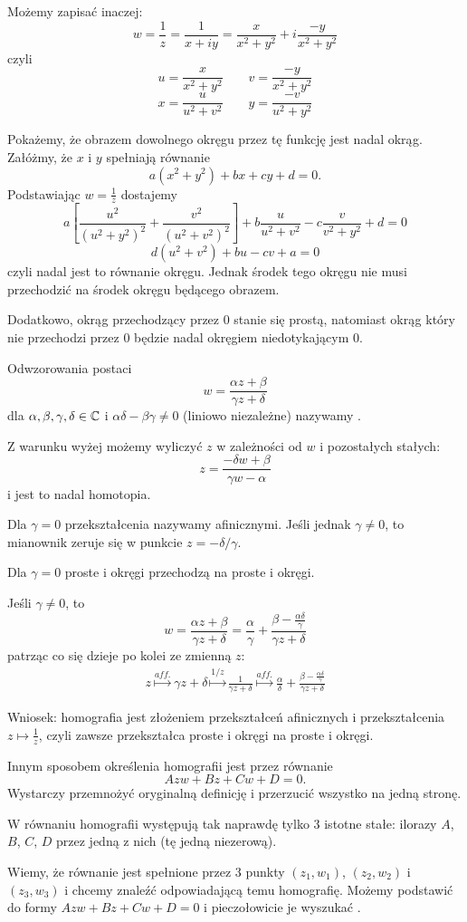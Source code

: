 \begin{example}
  Możemy zapisać inaczej:
  $$w=\frac{1}{z}=\frac{1}{x+iy}=\frac{x}{x^2+y^2}+i\frac{-y}{x^2+y^2}$$
  czyli
  $$u=\frac{x}{x^2+y^2}\quad\quad v=\frac{-y}{x^2+y^2}$$
  $$x=\frac{u}{u^2+v^2}\quad\quad y=\frac{-v}{u^2+y^2}$$

  Pokażemy, że obrazem dowolnego okręgu przez tę funkcję jest nadal okrąg. Załóżmy, że $x$ i $y$ spełniają równanie
  $$a(x^2+y^2)+bx+cy+d=0.$$
  Podstawiając $w=\frac{1}{z}$ dostajemy
  $$a\left[\frac{u^2}{(u^2+y^2)^2}+\frac{v^2}{(u^2+v^2)^2}\right]+b\frac{u}{u^2+v^2}-c\frac{v}{v^2+y^2}+d=0$$
  $$d(u^2+v^2)+bu-cv+a=0$$
  czyli nadal jest to równanie okręgu. Jednak środek tego okręgu nie musi przechodzić na środek okręgu będącego obrazem.

  Dodatkowo, okrąg przechodzący przez $0$ stanie się prostą, natomiast okrąg który nie przechodzi przez $0$ będzie nadal okręgiem niedotykającym $0$.
\end{example}

\begin{definition}[homografia]
  Odwzorowania postaci
  $$w=\frac{\alpha z+\beta}{\gamma z+\delta}$$
  dla $\alpha,\beta,\gamma,\delta\in\operatorname{\mathbb{C}}$ i $\alpha \delta-\beta\gamma \neq 0$ (liniowo niezależne) nazywamy .
\end{definition}

Z warunku wyżej możemy wyliczyć $z$ w  zależności od $w$ i pozostałych stałych:
$$z=\frac{-\delta w+\beta}{\gamma w-\alpha}$$
i jest to nadal homotopia.

Dla $\gamma=0$ przekształcenia nazywamy afinicznymi. Jeśli jednak $\gamma\neq 0$, to mianownik zeruje się w punkcie $z=-\delta/\gamma$.

Dla $\gamma=0$ proste i okręgi przechodzą na proste i okręgi.

Jeśli $\gamma\neq 0$, to
$$w=\frac{\alpha z+\beta}{\gamma z+\delta}=\frac{\alpha}{\gamma}+\frac{\beta-\frac{\alpha\delta}{\gamma}}{\gamma z+\delta}$$
patrząc co się dzieje po kolei ze zmienną $z$:
\begin{align*}
  z\overset{aff.}{\mapsto} \gamma z+\delta \overset{1/z}{\mapsto} \frac{1}{\gamma z+\delta}\overset{aff.}{\mapsto} \frac{\alpha}{\delta}+\frac{\beta-\frac{\alpha\delta}{\gamma}}{\gamma z+\delta}
\end{align*}

Wniosek: homografia jest złożeniem przekształceń afinicznych i przekształcenia $z\mapsto \frac{1}{z}$, czyli zawsze przekształca proste i okręgi na proste i okręgi.

Innym sposobem określenia homografii jest przez równanie
$$Azw+Bz+Cw+D=0.$$
Wystarczy przemnożyć oryginalną definicję i przerzucić wszystko na jedną stronę.

W równaniu homografii występują tak naprawdę tylko $3$ istotne stałe: ilorazy $A$, $B$, $C$, $D$ przez jedną z nich (tę jedną niezerową).

\begin{example}
\item Wiemy, że równanie jest spełnione przez $3$ punkty $(z_1,w_1)$, $(z_2, w_2)$ i $(z_3, w_3)$ i chcemy znaleźć odpowiadającą temu homografię. Możemy podstawić do formy $Azw+Bz+Cw+D=0$ i pieczołowicie je wyszukać .
\end{example}
